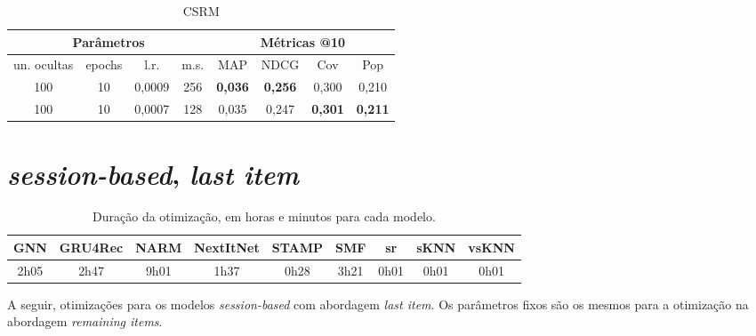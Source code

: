 \begin{table}[htbp]
  \centering
  \begin{tabular}{|c|c|c|c|c|c|c|c|}
    \hline
      \multicolumn{4}{|c|}{Parâmetros} & \multicolumn{4}{c|}{Métricas @10} \\
      \hline
      un. ocultas & epochs & l.r. & m.s. & MAP & NDCG & Cov & Pop \\
      \hline
      100 & 10 & 0,0009 & 256 & \textbf{0,036} & \textbf{0,256} & 0,300 & 0,210 \\
      \hline
      100 & 10 & 0,0007 & 128 & 0,035 & 0,247 & \textbf{0,301} & \textbf{0,211} \\
      \hline
     \end{tabular}
      \caption{CSRM}
      \label{opt:csrm_rem}
\end{table}


\newpage

\section{\textit{session-based}, \textit{last item}}

\begin{table}[htbp]
  \centering
  \begin{tabular}{|c|c|c|c|c|c|c|c|c|}
      \hline
      GNN & GRU4Rec & NARM & NextItNet & STAMP & SMF & sr & sKNN & vsKNN \\
      \hline
      2h05 & 2h47 & 9h01 & 1h37 & 0h28 &  3h21 & 0h01 & 0h01 & 0h01 \\
      \hline
      \end{tabular}
      \caption{Duração da otimização, em horas e minutos para cada modelo.}
\end{table}

A seguir, otimizações para os modelos \textit{session-based} com abordagem \textit{last
item}. Os parâmetros fixos são os mesmos para a otimização na abordagem \textit{remaining items}.


